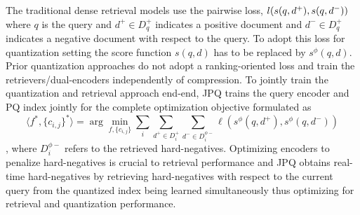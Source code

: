 The traditional dense retrieval models \cite{luan-etal-2021-sparse, zhan2020repbertcontextualizedtextembeddings} use the pairwise loss,
$l(s(q,d^+), \\ s(q,d^-))$ where $q$ is the query and $d^+ \in D_q^+$ indicates a positive document and $d^- \in D_q^+$ indicates a negative document with respect to the query. To adopt this loss for quantization setting the score function $s(q,d)$ has to be replaced by $s^\phi(q,d)$. Prior quantization approaches do not adopt a ranking-oriented loss and train the retrievers/dual-encoders independently of compression. To jointly train the quantization and retrieval approach end-end,
JPQ trains the query encoder and PQ index jointly for the complete optimization objective formulated as
\begin{equation}
\langle f^*, \{c_{i,j}\}^* \rangle = \arg\min_{f,\{c_{i,j}\}} \sum_{i}\sum_{d^+ \in D^{+}_i}\sum_{d^- \in D^{\phi-}_i} \ell(s^\phi(q, d^+), s^\phi(q, d^-))
\end{equation} 
, where $D^{\phi-}_i$ refers to the retrieved hard-negatives. Optimizing encoders to penalize hard-negatives is crucial to retrieval performance and JPQ obtains real-time hard-negatives by retrieving hard-negatives with respect to the current query from the quantized index being learned simultaneously thus optimizing for retrieval and quantization performance.

    
